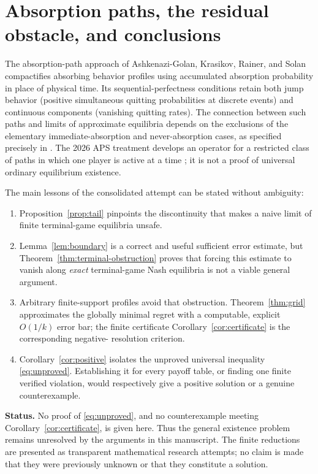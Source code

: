 \documentclass[11pt,a4paper]{article}
\numberwithin{equation}{section}
\theoremstyle{plain}
\theoremstyle{definition}
\theoremstyle{remark}
\begin{document}
\section{Absorption paths, the residual obstacle, and conclusions}\label{sec:discussion}
The absorption-path approach of Ashkenazi-Golan, Krasikov, Rainer,
and Solan \cite{AKRS2024} compactifies absorbing behavior profiles
using accumulated absorption probability in place of physical time.
Its sequential-perfectness conditions retain both jump behavior
(positive simultaneous quitting probabilities at discrete events)
and continuous components (vanishing quitting rates). The connection
between such paths and limits of approximate equilibria depends on
the exclusions of the elementary immediate-absorption and
never-absorption cases, as specified precisely in
\cite{AKRS2024,AKRS2026}. The 2026 APS treatment develops an operator
for a restricted class of paths in which one player is active at a
time \cite{AKRS2026}; it is not a proof of universal ordinary
equilibrium existence.

The main lessons of the consolidated attempt can be stated without
ambiguity:
\begin{enumerate}[label=\arabic*.]
\item Proposition~\ref{prop:tail} pinpoints the discontinuity that
makes a naive limit of finite terminal-game equilibria unsafe.
\item Lemma~\ref{lem:boundary} is a correct and useful sufficient
error estimate, but Theorem~\ref{thm:terminal-obstruction} proves that
forcing this estimate to vanish along \emph{exact} terminal-game
Nash equilibria is not a viable general argument.
\item Arbitrary finite-support profiles avoid that obstruction.
Theorem~\ref{thm:grid} approximates the globally minimal regret
with a computable, explicit $O(1/k)$ error bar; the finite certificate
Corollary~\ref{cor:certificate} is the corresponding negative-
resolution criterion.
\item Corollary~\ref{cor:positive} isolates the unproved universal
inequality \eqref{eq:unproved}. Establishing it for every payoff table,
or finding one finite verified violation, would respectively give
a positive solution or a genuine counterexample.
\end{enumerate}

\noindent\textbf{Status.} No proof of \eqref{eq:unproved}, and no
counterexample meeting Corollary~\ref{cor:certificate}, is given here.
Thus the general existence problem remains unresolved by the
arguments in this manuscript. The finite reductions are presented as
transparent mathematical research attempts; no claim is made that
they were previously unknown or that they constitute a solution.
\end{document}
